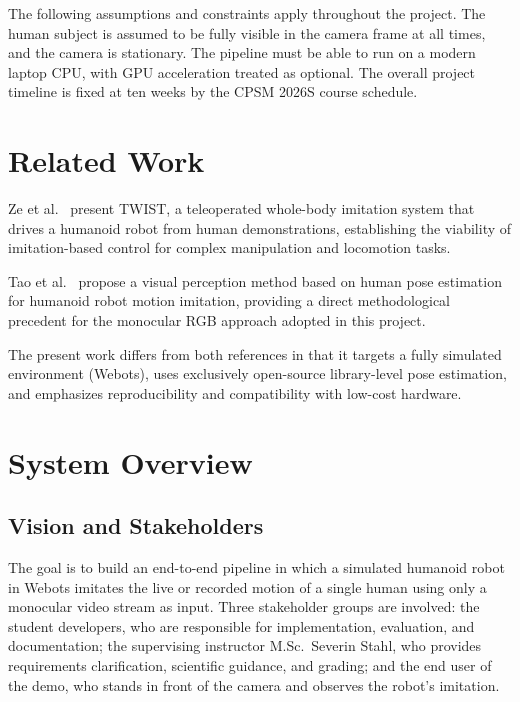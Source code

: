 \documentclass[conference]{IEEEtran}
\begin{document}
The following assumptions and constraints apply throughout the project. The human subject is
assumed to be fully visible in the camera frame at all times, and the camera is stationary.
The pipeline must be able to run on a modern laptop CPU, with GPU acceleration treated as
optional. The overall project timeline is fixed at ten weeks by the CPSM 2026S course schedule.
 
\section{Related Work}
Ze et al.\ \cite{ze2025twist} present TWIST, a teleoperated whole-body imitation system that
drives a humanoid robot from human demonstrations, establishing the viability of
imitation-based control for complex manipulation and locomotion tasks.
 
Tao et al.\ \cite{tao2021visual} propose a visual perception method based on human pose
estimation for humanoid robot motion imitation, providing a direct methodological precedent
for the monocular RGB approach adopted in this project.
 
The present work differs from both references in that it targets a fully simulated environment
(Webots), uses exclusively open-source library-level pose estimation, and emphasizes
reproducibility and compatibility with low-cost hardware.
 
\section{System Overview}
 
\subsection{Vision and Stakeholders}
The goal is to build an end-to-end pipeline in which a simulated humanoid robot in Webots
imitates the live or recorded motion of a single human using only a monocular video stream
as input. Three stakeholder groups are involved: the student developers, who are responsible
for implementation, evaluation, and documentation; the supervising instructor M.Sc.\ Severin
Stahl, who provides requirements clarification, scientific guidance, and grading; and the
end user of the demo, who stands in front of the camera and observes the robot's imitation.
 
\end{document}
